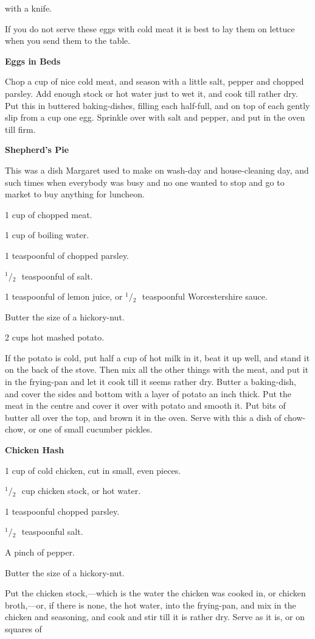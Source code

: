 \documentclass[11pt]{book}
\newcommand{\indpar}{\par\noindent\hspace*{\parindent}}
\newcommand{\ingredient}{\indpar}
\newcommand{\instruction}{\indpar}
\newcommand{\OneHalf}{\ensuremath{{}^1\!\!/\!{}_2\mbox{\ }}}
\newenvironment{RecipeTitle}{\medskip\begin{center}\large\bf }{\end{center}\smallskip}
\begin{document}
with a knife.
\instruction
  If you do not serve these eggs with cold meat it is best
to lay them on lettuce when you send them to the table.
\begin{RecipeTitle}
Eggs in Beds\label{eggs_in_bed}
\end{RecipeTitle}
\instruction
  Chop a cup of nice cold meat, and season with a little
salt, pepper and chopped parsley.  Add enough stock or hot
water just to wet it, and cook till rather dry.  Put this in
buttered baking-dishes, filling each half-full, and on top
of each gently slip from a cup one egg.  Sprinkle over with
salt and pepper, and put in the oven till firm.\pagebreak[4]
\begin{RecipeTitle}
Shepherd's Pie\label{shepherds_pie}
\end{RecipeTitle}
\instruction
  This was a dish Margaret used to make on wash-day and
house-cleaning day, and such times when everybody was
busy and no one wanted to stop and go to market to buy
anything for luncheon.
\ingredient  1 cup of chopped meat.
\ingredient  1 cup of boiling water.
\ingredient  1 teaspoonful of chopped parsley.
\ingredient  \OneHalf teaspoonful of salt.
\ingredient  1 teaspoonful of lemon juice, or \OneHalf teaspoon\-ful
Worcestershire sauce.
\ingredient  Butter the size of a hickory-nut.
\ingredient  2 cups hot mashed potato.
\instruction
  If the potato is cold, put half a cup of hot milk in it,
beat it up well, and stand it on the back of the stove.
Then mix all the other things with the meat, and put it
in the frying-pan and let it cook till it seems rather
dry.  Butter a baking-dish, and cover the sides and
bottom with a layer of potato an inch thick.  Put the
meat in the centre and cover it over with potato and
smooth it.  Put bits of butter all over the top, and
brown it in the oven.  Serve with this a dish of chow-chow,
or one of small cucumber pickles.
\begin{RecipeTitle}
Chicken Hash\label{chicken_hash}
\end{RecipeTitle}
\ingredient  1 cup of cold chicken, cut in small, even pieces.
\ingredient  \OneHalf cup chicken stock, or hot water.
\ingredient  1 teaspoonful chopped parsley.
\ingredient  \OneHalf teaspoonful salt.
\ingredient  A pinch of pepper.
\ingredient  Butter the size of a hickory-nut.
\instruction
  Put the chicken stock,---which is the water the
chicken was cooked in, or chicken broth,---or, if
there is none, the hot water, into the frying-pan, and
mix in the chicken and seasoning, and cook and stir till
it is rather dry.  Serve as it is, or on squares of
\end{document}
